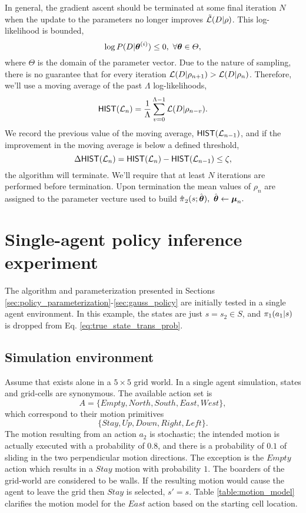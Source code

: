     In general, the gradient ascent should be terminated at some final iteration $N$ when the update to the parameters
    no longer improves
    $\tilde{\mathcal{L}}(D|\rho)$. This log-likelihood is bounded,
    \[
    \log P(D|\boldsymbol{\mathbb{\theta}}^{(i)}) \leq 0,\  \forall \boldsymbol{\mathbb{\theta}} \in \varTheta,
    \]
    where $\varTheta$ is the domain of the parameter vector. Due to the nature of sampling, there is no guarantee that
    for every iteration $\mathcal{L}(D|\rho_{n+1})> \mathcal{L}(D|\rho_n)$. Therefore, we'll use a moving average of the past
    $\Lambda$ log-likelihoods,
    \[
    \mathsf{HIST}(\mathcal{L}_n)=\frac{1}{\Lambda}\sum_{v=0}^{\Lambda-1}\mathcal{L}(D|\rho_{n-v}).
    \]
    We record the previous value of the moving average, $\mathsf{HIST}(\mathcal{L}_{n-1})$, and if the improvement in the
    moving average is below a defined threshold,
    \[
    \Delta\mathsf{HIST}(\mathcal{L}_n) = \mathsf{HIST}(\mathcal{L}_n) - \mathsf{HIST}(\mathcal{L}_{n-1}) \leq \zeta,
    \]
    the algorithm will terminate. We'll require that at least $N$ iterations are performed before termination. Upon
    termination the mean values of $\rho_{n}$ are assigned to the parameter vecture used to build
    $\estimate{\policy{}}_{2}(s;\estimate{\paramVec}),\ \estimate{\paramVec} \leftarrow \vect{\mu}_n.$

    \section{Single-agent policy inference experiment}\label{sec:single_agent_experiment}
    The algorithm and parameterization presented in Sections \ref{sec:policy_parameterization}-\ref{sec:gauss_policy}
    are initially tested in a single agent environment. In this example, the states are just $s=s_2 \in S$, and
    $\pi_{1}(a_1|s)$ is dropped from Eq. \ref{eq:true_state_trans_prob}.

    \subsection{Simulation environment}
    Assume that  exists alone in a $5\times5$ grid world. In a single agent simulation, states and grid-cells
    are synonymous. The available action set is
    \[
    A = \{Empty, North, South, East, West\},
    \]
    which correspond to their motion primitives
    \[
    \{Stay, Up, Down, Right, Left\}.
    \]
    The motion resulting from an action $a_2$ is stochastic; the intended motion is actually executed with a probability
    of $0.8$, and there is a probability of $0.1$ of sliding in the two perpendicular motion directions. The exception
    is the $Empty$ action which results in a $Stay$ motion with probability $1$. The boarders of the grid-world are
    considered to be walls. If the resulting motion would cause the agent to leave the grid then $Stay$ is selected, $s'=s$.
    Table \ref{table:motion_model} clarifies the motion model for the $East$ action based on the starting cell location.

